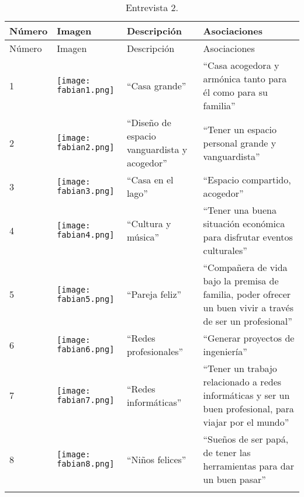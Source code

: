 \begin{longtable}{>{\centering\arraybackslash}m{1cm} >{\centering\arraybackslash}m{2cm} >{\arraybackslash}m{5cm}>{\arraybackslash}m{5cm}}
	
	\hline
	Número & Imagen & Descripción & Asociaciones \\
	\hline \hline
	\endfirsthead
	
	\hline
	Número & Imagen & Descripción & Asociaciones \\
	\hline \hline
	\endhead

1 & \texttt{[image: fabian1.png]} & ``Casa grande'' &  ``Casa acogedora y armónica tanto para él como para su familia''\\
\hline

2 & \texttt{[image: fabian2.png]} & ``Diseño de espacio vanguardista y acogedor'' & ``Tener un espacio personal grande y vanguardista'' \\
\hline

3 & \texttt{[image: fabian3.png]} & ``Casa en el lago'' & ``Espacio compartido, acogedor''\\
\hline

4 & \texttt{[image: fabian4.png]} & ``Cultura y música'' &  ``Tener una buena situación económica para disfrutar eventos culturales'' \\
\hline

5 & \texttt{[image: fabian5.png]} & ``Pareja feliz'' & ``Compañera de vida bajo la premisa de familia, poder ofrecer un buen vivir a través de ser un profesional'' \\
\hline

6 & \texttt{[image: fabian6.png]} & ``Redes profesionales'' & ``Generar proyectos de ingeniería''\\
\hline

7 & \texttt{[image: fabian7.png]} & ``Redes informáticas''  & ``Tener un trabajo relacionado a redes informáticas y ser un buen profesional, para viajar por el mundo'' \\
\hline

8 & \texttt{[image: fabian8.png]} & ``Niños felices'' & ``Sueños de ser papá, de tener las herramientas para dar un buen pasar'' \\
\hline


\caption{Entrevista 2.}
\label{tabla:fabian}
\end{longtable}



